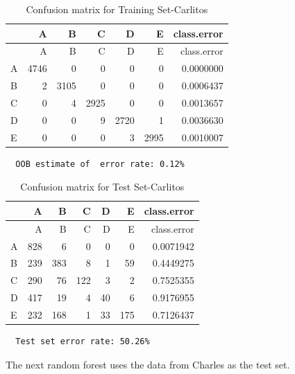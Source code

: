 \documentclass[12pt,twoside]{reedthesis}
\begin{document}
  \begin{longtable}[c]{@{}lrrrrrr@{}}
  \caption{Confusion matrix for Training Set-Carlitos}\tabularnewline
  \toprule
  & A & B & C & D & E & class.error\tabularnewline
  \midrule
  \endfirsthead
  \toprule
  & A & B & C & D & E & class.error\tabularnewline
  \midrule
  \endhead
  A & 4746 & 0 & 0 & 0 & 0 & 0.0000000\tabularnewline
  B & 2 & 3105 & 0 & 0 & 0 & 0.0006437\tabularnewline
  C & 0 & 4 & 2925 & 0 & 0 & 0.0013657\tabularnewline
  D & 0 & 0 & 9 & 2720 & 1 & 0.0036630\tabularnewline
  E & 0 & 0 & 0 & 3 & 2995 & 0.0010007\tabularnewline
  \bottomrule
  \end{longtable}
  
  \begin{verbatim}
  OOB estimate of  error rate: 0.12%
  \end{verbatim}
  
  \begin{longtable}[c]{@{}lrrrrrr@{}}
  \caption{Confusion matrix for Test Set-Carlitos}\tabularnewline
  \toprule
  & A & B & C & D & E & class.error\tabularnewline
  \midrule
  \endfirsthead
  \toprule
  & A & B & C & D & E & class.error\tabularnewline
  \midrule
  \endhead
  A & 828 & 6 & 0 & 0 & 0 & 0.0071942\tabularnewline
  B & 239 & 383 & 8 & 1 & 59 & 0.4449275\tabularnewline
  C & 290 & 76 & 122 & 3 & 2 & 0.7525355\tabularnewline
  D & 417 & 19 & 4 & 40 & 6 & 0.9176955\tabularnewline
  E & 232 & 168 & 1 & 33 & 175 & 0.7126437\tabularnewline
  \bottomrule
  \end{longtable}
  
  \begin{verbatim}
  Test set error rate: 50.26%
  \end{verbatim}
  
  The next random forest uses the data from Charles as the test set.
  
  \begin{Shaded}
  \begin{Highlighting}[]
  \NormalTok{(}\NormalTok{)}
  
  \StringTok{ }\NormalTok{wl2[wl2$user_name ==}\StringTok{ }\NormalTok{subjects[}\NormalTok{], ]}
  \StringTok{ }\NormalTok{wl2[wl2$user_name !=}\StringTok{ }\NormalTok{subjects[}\NormalTok{], ]}
  \StringTok{ }\NormalTok{(} \NormalTok{OtherSubs3[, }\NormalTok{:}\NormalTok{], } 
                                  \NormalTok{Sub3[, }\NormalTok{:}\NormalTok{], } 
                                  \NormalTok{)}
  \end{Highlighting}
  \end{Shaded}
  
\end{document}
